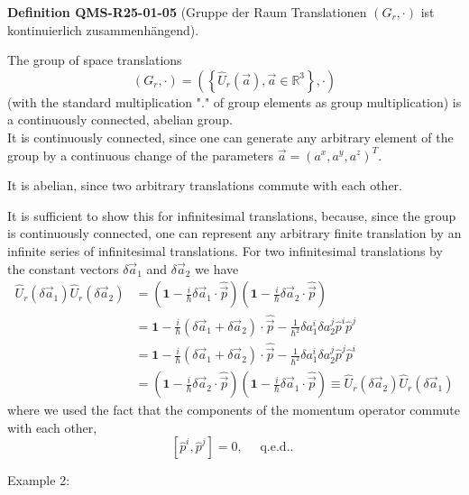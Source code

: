 \documentclass[10pt, letterpaper]{article}
\newcommand{\CustomHeading}[3]{%
  \par\medskip\noindent%
  \textbf{#1 #2} \textnormal{(#3)}.\enskip%
}
\newenvironment{DEF}[2]{\begin{unitbox}\CustomHeading{Definition}{#1}{#2}}{\end{unitbox}}
\begin{document}
\begin{DEF}{QMS-R25-01-05}{Gruppe der Raum Translationen $(G_{r}, \cdot)$ ist kontinuierlich zusammenhängend}
The group of space translations
$$
\left(G_{r}, \cdot\right)=\left(\left\{\hat{U}_{r}(\vec{a}), \vec{a} \in \mathbb{R}^{3}\right\}, \cdot\right)
$$
(with the standard multiplication "." of group elements as group multiplication) is a continuously connected, abelian group.\\
It is continuously connected, since one can generate any arbitrary element of the group by a continuous change of the parameters $\vec{a}=\left(a^{x}, a^{y}, a^{z}\right)^{T}$.

It is abelian, since two arbitrary translations commute with each other. 

It is sufficient to show this for infinitesimal translations, because, since the group is continuously connected, one can represent any arbitrary finite translation by an infinite series of infinitesimal translations. For two infinitesimal translations by the constant vectors $\delta \vec{a}_{1}$ and $\delta \vec{a}_{2}$ we have
$$
\begin{aligned}
\hat{U}_{r}\left(\delta \vec{a}_{1}\right) \hat{U}_{r}\left(\delta \vec{a}_{2}\right) & =\left(\mathbf{1}-\frac{i}{\hbar} \delta \vec{a}_{1} \cdot \hat{\vec{p}}\right)\left(\mathbf{1}-\frac{i}{\hbar} \delta \vec{a}_{2} \cdot \hat{\vec{p}}\right) \\
& =\mathbf{1}-\frac{i}{\hbar}\left(\delta \vec{a}_{1}+\delta \vec{a}_{2}\right) \cdot \hat{\vec{p}}-\frac{1}{\hbar^{2}} \delta a_{1}^{i} \delta a_{2}^{j} \hat{p}^{i} \hat{p}^{j} \\
& =\mathbf{1}-\frac{i}{\hbar}\left(\delta \vec{a}_{1}+\delta \vec{a}_{2}\right) \cdot \hat{\vec{p}}-\frac{1}{\hbar^{2}} \delta a_{1}^{i} \delta a_{2}^{j} \hat{p}^{j} \hat{p}^{i} \\
& =\left(\mathbf{1}-\frac{i}{\hbar} \delta \vec{a}_{2} \cdot \hat{\vec{p}}\right)\left(\mathbf{1}-\frac{i}{\hbar} \delta \vec{a}_{1} \cdot \hat{\vec{p}}\right) \equiv \hat{U}_{r}\left(\delta \vec{a}_{2}\right) \hat{U}_{r}\left(\delta \vec{a}_{1}\right)
\end{aligned}
$$
where we used the fact that the components of the momentum operator commute with each other,
$$
\left[\hat{p}^{i}, \hat{p}^{j}\right]=0, \quad \text { q.e.d.. }
$$
\end{DEF}


Example 2: 
\end{document}

